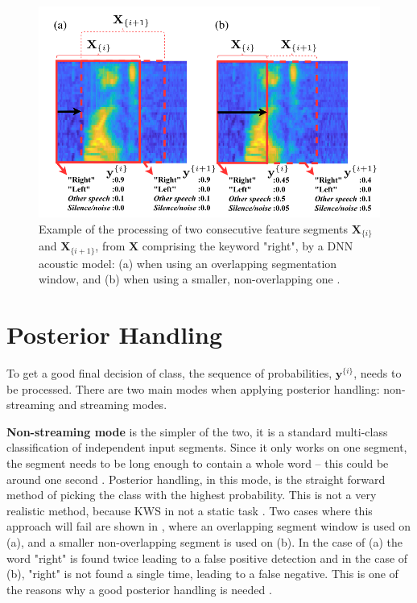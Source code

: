 \begin{figure}[ht]
    \centering
    \includegraphics[width=\textwidth]{incl/img/kws/acoustic_model.png}
    \caption{Example of the processing of two consecutive feature segments \(\textbf{X}_{\{i\}}\) and \(\textbf{X}_{\{i +1\}}\), from \(\textbf{X}\) comprising the keyword "right", by a DNN acoustic model: (a) when using an overlapping segmentation window, and (b) when using a smaller, non-overlapping one \cite{lopez2021deep}. }
    \label{fig:acoustic_model}
\end{figure}

\section{Posterior Handling}
To get a good final decision of class, the sequence of probabilities, \(\textbf{y}^{\{i\}}\), needs to be processed. There are two main modes when applying posterior handling: non-streaming and streaming modes.

\textbf{Non-streaming mode} is the simpler of the two, it is a standard multi-class classification of independent input segments. Since it only works on one segment, the segment needs to be long enough to contain a whole word – this could be around one second \cite{lopez2021deep}. Posterior handling, in this mode, is the straight forward method of picking the class with the highest probability. This is not a very realistic method, because KWS in not a static task \cite{lopez2021deep}. Two cases where this approach will fail are shown in , where an overlapping segment window is used on (a), and a smaller non-overlapping segment is used on (b). In the case of (a) the word "right" is found twice leading to a false positive detection and in the case of (b), "right" is not found a single time, leading to a false negative. This is one of the reasons why a good posterior handling is needed \cite{lopez2021deep}.


